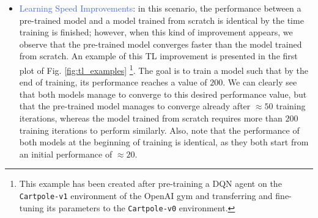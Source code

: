 \begin{itemize}
	\item \textcolor{RoyalBlue}{Learning Speed Improvements}: in this scenario, the performance between a pre-trained model and a model trained from scratch is identical by the time training is finished; however, when this kind of improvement appears, we observe that the pre-trained model converges faster than the model trained from scratch. An example of this TL improvement is presented in the first plot of Fig. \ref{fig:tl_examples} \footnote{This example has been created after pre-training a DQN agent \cite{mnih2015human} on the \texttt{Cartpole-v1} environment of the OpenAI gym \cite{brockman2016openai} and transferring and fine-tuning its parameters to the \texttt{Cartpole-v0} environment.}. The goal is to train a model such that by the end of training, its performance reaches a value of $200$. We can clearly see that both models manage to converge to this desired performance value, but that the pre-trained model manages to converge already after $\approx 50$ training iterations, whereas the model trained from scratch requires more than $200$ training iterations to perform similarly. Also, note that the performance of both models at the beginning of training is identical, as they both start from an initial performance of $\approx20$.


\end{itemize}
